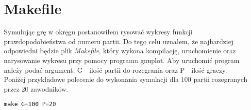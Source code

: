 \section{Makefile}
\label{sec::makefile}
Symulując grę w okręgu postanowiłem rysować wykresy funkcji prawdopodobieństwa od numeru partii. Do tego celu uznałem, że najbardziej odpowiedni będzie plik \textit{Makefile}, który wykona kompilację, uruchomienie oraz narysowanie wykresu przy pomocy programu gnuplot. Aby uruchomić program należy podać argument: G - ilość partii do rozegrania oraz P - ilość graczy. Poniżej przykładowe polecenie do wykonania symulacji dla 100 partii rozegranych przez 20 zawodników.
\begin{verbatim}
make G=100 P=20
\end{verbatim}
